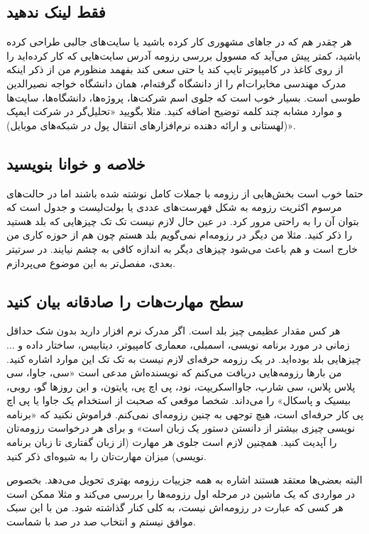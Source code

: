 \subsection*{فقط لینک ندهید}
هر چقدر هم که در جاهای مشهوری کار کرده باشید یا سایت‌های جالبی طراحی کرده باشید، کمتر پیش می‌آید که مسوول بررسی رزومه آدرس سایت‌هایی که کار کرده‌اید را از روی کاغذ در کامپیوتر تایپ کند یا حتی سعی کند بفهمد منظورم من از ذکر اینکه مدرک مهندسی مخابرات‌ام را از دانشگاه
گرفته‌ام، همان دانشگاه خواجه نصیرالدین طوسی است. بسیار خوب است که جلوی اسم شرکت‌ها، پروژه‌ها،‌ دانشگاه‌ها، سایت‌ها و موارد مشابه چند کلمه توضیح اضافه کنید. مثلا بگویید «تحلیل‌گر در شرکت ایمپک (لهستانی و ارائه دهنده نرم‌افزارهای انتقال پول در شبکه‌های موبایل)».
\subsection*{خلاصه و خوانا بنویسید}
حتما خوب است بخش‌هایی از رزومه با جملات کامل نوشته شده باشند اما در حالت‌های مرسوم اکثریت رزومه به شکل فهرست‌های عددی یا بولت‌لیست و جدول است که بتوان آن را به راحتی مرور کرد. در عین حال لازم نیست تک تک چیزهایی که بلد هستید را ذکر کنید. مثلا من دیگر در رزومه‌ام نمی‌گویم
بلد هستم چون هم از حوزه کاری من خارج است و هم باعث می‌شود چیزهای دیگر به اندازه کافی به چشم نیایند. در سرتیتر بعدی، مفصل‌تر به این موضوع می‌پردازم.
\subsection*{سطح مهارت‌هات را صادقانه بیان کنید}
هر کس مقدار عظیمی چیز بلد است. اگر مدرک نرم افزار دارید بدون شک حداقل زمانی در مورد برنامه نویسی، اسمبلی، معماری کامپیوتر، دیتابیس، ساختار داده و ... چیزهایی بلد بوده‌اید. در یک رزومه حرفه‌ای لازم نیست به تک تک این موارد اشاره کنید. من بارها رزومه‌هایی دریافت می‌کنم که نویسنده‌اش مدعی است «سی، جاوا، سی پلاس پلاس، سی شارپ، جاوااسکریپت، نود، پی اچ پی، پایتون، و این روزها گو، روبی، بیسیک و پاسکال» را می‌داند. شخصا موقعی که صحبت از استخدام یک جاوا یا پی اچ پی کار حرفه‌ای است، هیچ توجهی به چنین رزومه‌ای نمی‌کنم. فراموش نکنید که «برنامه نویسی چیزی بیشتر از دانستن دستور یک زبان است» و برای هر درخواست رزومه‌تان را آپدیت کنید. همچنین لازم است جلوی هر مهارت (از زبان گفتاری تا زبان برنامه نویسی) میزان مهارت‌تان را به شیوه‌ای ذکر کنید.
\begin{mdframed}
البته بعضی‌ها معتقد هستند اشاره به همه جزییات رزومه بهتری تحویل می‌دهد. بخصوص در مواردی که یک ماشین در مرحله اول رزومه‌ها را بررسی می‌کند و مثلا ممکن است هر کسی که عبارت
در رزومه‌اش نیست، به کلی کنار گذاشته شود. من با این سبک موافق نیستم و انتخاب صد در صد با شماست.
\end{mdframed}
